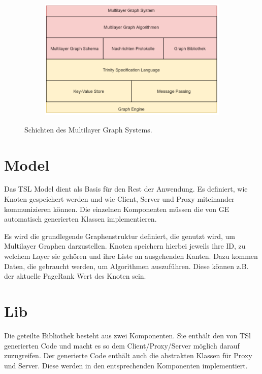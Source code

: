 \begin{figure}
  \centering
  \begin{subfigure}[b]{1.0\textwidth}
    \includegraphics[width=1.0\linewidth]{img/Architektur-Komponenten.png}
  \end{subfigure}
  \caption{Schichten des Multilayer Graph Systems.}
  \label{schichtmodel}
\end{figure}


\section{Model}

Das TSL Model dient als Basis für den Rest der Anwendung. Es definiert, wie Knoten gespeichert werden und wie Client, Server und Proxy miteinander
kommunizieren können. Die einzelnen Komponenten müssen die von GE automatisch generierten Klassen implementieren.


Es wird die grundlegende Graphenstruktur definiert, die genutzt wird, um Multilayer Graphen darzustellen. Knoten speichern hierbei jeweils ihre ID, zu welchem Layer sie gehören
und ihre Liste an ausgehenden Kanten. Dazu kommen Daten, die gebraucht werden, um Algorithmen auszuführen. Diese können z.B. der aktuelle PageRank Wert des Knoten sein.


\section{Lib}

Die geteilte Bibliothek besteht aus zwei Komponenten. Sie enthält den von TSl generierten Code und macht es so dem Client/Proxy/Server möglich darauf zuzugreifen. Der generierte Code enthält auch die abstrakten Klassen für Proxy und Server. Diese werden in den entsprechenden Komponenten implementiert. 

